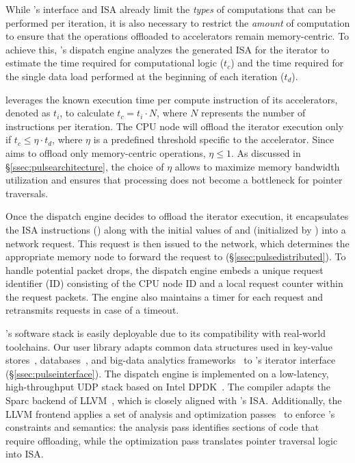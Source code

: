  While \pulse's interface and ISA already limit the \emph{types} of computations that can be performed per iteration, it is also necessary to restrict the \emph{amount} of computation to ensure that the operations offloaded to \pulse accelerators remain memory-centric. To achieve this, \pulse's dispatch engine analyzes the generated ISA for the iterator to estimate the time required for computational logic ($t_c$) and the time required for the single data load performed at the beginning of each iteration ($t_d$).

\pulse leverages the known execution time per compute instruction of its accelerators, denoted as $t_i$, to calculate $t_c = t_i \cdot N$, where $N$ represents the number of instructions per iteration. The CPU node will offload the iterator execution only if $t_c \leq \eta \cdot t_d$, where $\eta$ is a predefined threshold specific to the accelerator. Since \pulse aims to offload only memory-centric operations, $\eta \leq 1$. As discussed in \S\ref{ssec:pulsearchitecture}, the choice of $\eta$ allows \pulse to maximize memory bandwidth utilization and ensures that processing does not become a bottleneck for pointer traversals.

 Once the dispatch engine decides to offload the iterator execution, it encapsulates the ISA instructions () along with the initial values of  and  (initialized by ) into a network request. This request is then issued to the network, which determines the appropriate memory node to forward the request to (\S\ref{ssec:pulsedistributed}). To handle potential packet drops, the dispatch engine embeds a unique request identifier (ID) consisting of the CPU node ID and a local request counter within the request packets. The engine also maintains a timer for each request and retransmits requests in case of a timeout.

 \pulse's software stack is easily deployable due to its compatibility with real-world toolchains. Our user library adapts common data structures used in key-value stores~\cite{redis, memcached}, databases~\cite{wiredtiger, btree1, btree2, trie1, trie3}, and big-data analytics frameworks~\cite{powergraph, graphx, graphchi, pagerank} to \pulse's iterator interface (\S\ref{ssec:pulseinterface}). The \pulse dispatch engine is implemented on a low-latency, high-throughput UDP stack based on Intel DPDK~\cite{dpdk}. The \pulse compiler adapts the Sparc backend of LLVM~\cite{llvmsparc}, which is closely aligned with \pulse's ISA. Additionally, the LLVM frontend applies a set of analysis and optimization passes~\cite{llvmpass} to enforce \pulse's constraints and semantics: the analysis pass identifies sections of code that require offloading, while the optimization pass translates pointer traversal logic into \pulse ISA.



